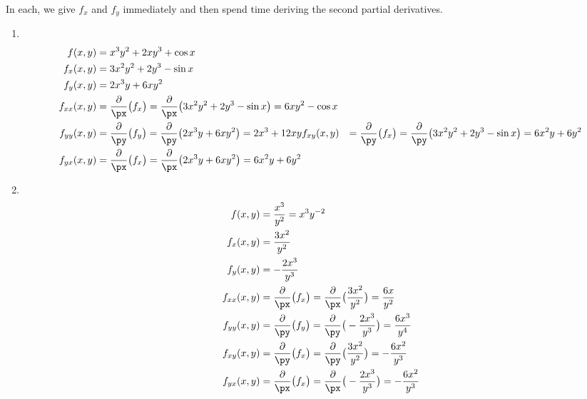 

{In each, we give $f_x$ and $f_y$ immediately and then spend time deriving the second partial derivatives.
\begin{enumerate}
	\item\mbox{}\\[-2\baselineskip]
	\begin{align*}
	f(x,y) &= x^3y^2+2xy^3+\cos x \\
	f_x(x,y) &= 3x^2y^2+2y^3-\sin x \\
	f_y(x,y) &= 2x^3y+6xy^2 \\
	f_{xx}(x,y) &= \frac{\partial}{\px}\big(f_x\big) = \frac{\partial}{\px}\big(3x^2y^2+2y^3-\sin x\big) = 6xy^2-\cos x \\
	f_{yy}(x,y) &= \frac{\partial}{\py}\big(f_y\big) = \frac{\partial}{\py}\big(2x^3y+6xy^2\big) = 2x^3+12xy
	f_{xy}(x,y) &= \frac{\partial}{\py}\big(f_x\big) = \frac{\partial}{\py}\big(3x^2y^2+2y^3-\sin x\big) = 6x^2y+6y^2 \\
	f_{yx}(x,y) &= \frac{\partial}{\px}\big(f_x\big) = \frac{\partial}{\px}\big(2x^3y+6xy^2\big) = 6x^2y+6y^2
	\end{align*}

	\item\mbox{}\\[-2\baselineskip]
	\begin{align*}
	f(x,y) &= \frac{x^3}{y^2} = x^3y^{-2} \\
	f_x(x,y) &= \frac{3x^2}{y^2} \\
	f_y(x,y) &= -\frac{2x^3}{y^3} \\
	f_{xx}(x,y) &= \frac{\partial}{\px}\big(f_x\big) = \frac{\partial}{\px}\big(\frac{3x^2}{y^2}\big) = \frac{6x}{y^2} \\
	f_{yy}(x,y) &= \frac{\partial}{\py}\big(f_y\big) = \frac{\partial}{\py}\big(-\frac{2x^3}{y^3}\big) = \frac{6x^3}{y^4} \\
	f_{xy}(x,y) &= \frac{\partial}{\py}\big(f_x\big) = \frac{\partial}{\py}\big(\frac{3x^2}{y^2}\big) = -\frac{6x^2}{y^3} \\
	f_{yx}(x,y) &= \frac{\partial}{\px}\big(f_x\big) = \frac{\partial}{\px}\big(-\frac{2x^3}{y^3}\big) = -\frac{6x^2}{y^3}
	\end{align*}


\end{enumerate}}
